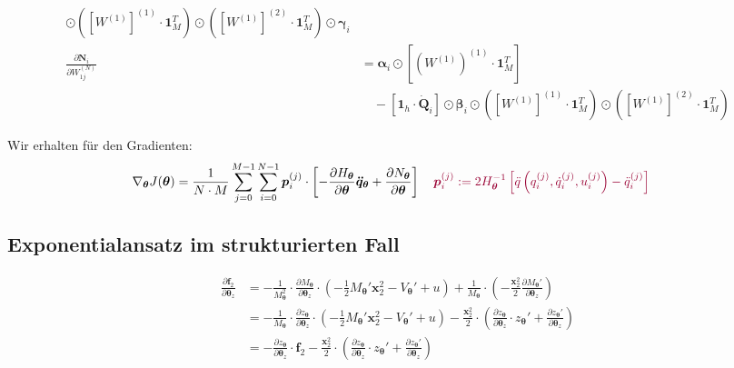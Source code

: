 \documentclass[a4paper, 12pt]{scrartcl}
\newcommand{\dunkelrot}[2][dunkelrot]{\textcolor{#1}{#2}}
\begin{document}
\begin{align*}
    \odot 
    \left(\left[W^{(1)}\right]^{(1)} \cdot \bm{1}_M^T \right)
    \odot
    \left(\left[W^{(1)}\right]^{(2)} \cdot \bm{1}_M^T \right)
    \odot
    \bm{\gamma}_i
    \\
    \frac{\partial \bm{N}_i}{\partial W_{1j}^{(N)}}
    &=
    \bm{\alpha}_i 
    \odot 
    \left[
        \left(W^{(1)}\right)^{(1)}
        \cdot 
        \bm{1}_M^T
    \right]
    \\
    &\quad -
    \left[\bm{1}_h \cdot \bm{\dot{Q}}_i \right] \odot
    \bm{\beta}_i
    \odot
    \left(\left[W^{(1)}\right]^{(1)} \cdot \bm{1}_M^T \right)
    \odot
    \left(\left[W^{(1)}\right]^{(2)} \cdot \bm{1}_M^T \right)
\end{align*}

Wir erhalten für den Gradienten: 
\begin{align*}
    \nabla_{\bm{\theta}} J(\bm{\theta}) 
    &=
    \frac{1}{N \cdot M}
    \sum_{j=0}^{M-1} \sum_{i=0}^{N-1} \bm{p}_i^{(j)}
    \cdot
    \left[
        - \frac{\partial H_{\bm{\theta}}}{\partial \bm{\theta}}
        \bm{\ddot{q}_{\theta}}
        +
        \frac{\partial N_{\bm{\theta}}}{\partial \bm{\theta}}
    \right]
    \quad
    \dunkelrot{
        \bm{p}_i^{(j)} := 2H^{-1}_{\bm{\theta}} 
        \left[
            \ddot{q}
            \left(
                q_i^{(j)}, \dot{q}_i^{(j)}, u_i^{(j)}
            \right) 
            - 
            \ddot{q}_{i}^{(j)}
        \right]
    }
\end{align*}

\subsection{Exponentialansatz im strukturierten Fall}

\begin{align*}
    \frac{\partial \bm{f}_2}{\partial \bm{\theta}_z}
    &=
    -\frac{1}{M_{\bm{\theta}}^2} \cdot 
    \frac{\partial M_{\bm{\theta}}}{\partial \bm{\theta}_z}
    \cdot 
    \left(
        -\frac{1}{2} M_{\bm{\theta}}' \bm{x}_2^2 - V_{\bm{\theta}}' + u
    \right)
    +
    \frac{1}{M_{\bm{\theta}}}
    \cdot 
    \left(
        -\frac{\bm{x}_2^2}{2} \frac{\partial M_{\bm{\theta}}'}{\partial \bm{\theta}_z}
    \right)
    \\
    &=
    -\frac{1}{M_{\bm{\theta}}} \cdot 
    \frac{\partial z_{\bm{\theta}}}{\partial \bm{\theta}_z}
    \cdot 
    \left(
        -\frac{1}{2} M_{\bm{\theta}}' \bm{x}_2^2 - V_{\bm{\theta}}' + u
    \right)
    - \frac{\bm{x}_2^2}{2}
    \cdot
    \left(
        \frac{\partial z_{\bm{\theta}}}{\partial \bm{\theta}_z}
        \cdot
        z_{\bm{\theta}}'
        +
        \frac{\partial z_{\bm{\theta}}'}{\partial \bm{\theta}_z}
    \right)
    \\
    &=
    - \frac{\partial z_{\bm{\theta}}}{\partial \bm{\theta}_z} \cdot \bm{f}_2
    - \frac{\bm{x}_2^2}{2}
    \cdot
    \left(
        \frac{\partial z_{\bm{\theta}}}{\partial \bm{\theta}_z}
        \cdot
        z_{\bm{\theta}}'
        +
        \frac{\partial z_{\bm{\theta}}'}{\partial \bm{\theta}_z}
    \right)
\end{align*}
\end{document}
